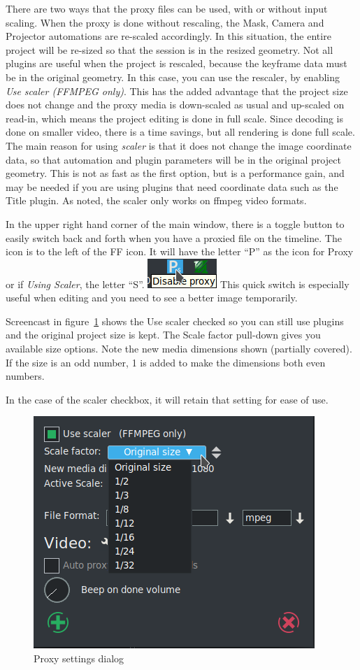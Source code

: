 There are two ways that the proxy files can be used, with or without input scaling. When the proxy is done without rescaling, the Mask, Camera and Projector automations are re-scaled accordingly. In this situation, the entire project will be re-sized so that the session is in the resized geometry.  Not all plugins are useful when the project is rescaled, because the keyframe data must be in the original geometry.  In this case, you can use the rescaler, by enabling \textit{Use scaler (FFMPEG only)}. This has the added advantage that the project size does not change and the proxy media is down-scaled as usual and up-scaled on read-in, which means the project editing is done in full scale.   Since decoding is done on smaller video, there is a time savings, but all rendering is done full scale.  The main reason for using \textit{scaler} is that it does not change the image coordinate data, so that automation and plugin parameters will be in the original project geometry.   This is not as fast as the first option, but is a performance gain, and may be needed if you are using plugins that need coordinate data such as the Title plugin.  As noted, the scaler only works on ffmpeg video formats.

In the upper right hand corner of the main window, there is a toggle button to easily switch back and forth when you have a proxied file on the timeline.  The icon is to the left of the FF icon.  It will have the letter “P” as the icon for Proxy or if \textit{Using Scaler}, the letter “S”. \quad \includegraphics[height=\baselineskip]{images/proxy-01.png} \quad This quick switch is especially useful when editing and you need to see a better image temporarily.

Screencast in figure~\ref{fig:proxy-02} shows the Use scaler checked so you can still use plugins and the original project size is kept.  The Scale factor pull-down gives you available size options.  Note the new media dimensions shown (partially covered).  If the size is an odd number, 1 is added to make the dimensions both even numbers.

In the case of the scaler checkbox, it will retain that setting for ease of use.

\begin{figure}[htpb]
	\centering
	\includegraphics[width=0.6\linewidth]{images/proxy-02.png}
	\caption{Proxy settings dialog}
	\label{fig:proxy-02}
\end{figure}

